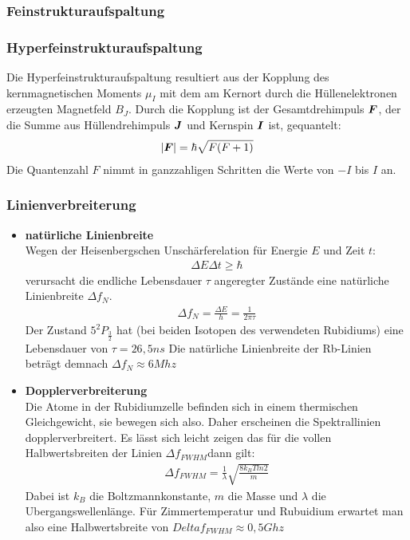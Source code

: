\documentclass[12pt]{article}
\renewcommand*\vec[1]{{\mbox{\boldmath\ensuremath{#1}}}}
\begin{document}
\subsubsection{Feinstrukturaufspaltung}

\subsubsection{Hyperfeinstrukturaufspaltung}
Die Hyperfeinstrukturaufspaltung resultiert aus der Kopplung des kernmagnetischen Moments $\mu_I$ mit dem am Kernort durch die Hüllenelektronen erzeugten Magnetfeld $B_J$.
Durch die Kopplung ist der Gesamtdrehimpuls $\vec{F}$, der die Summe aus Hüllendrehimpuls $\vec{J}$ und Kernspin $\vec{I}$ ist, gequantelt:
\begin{align*}
 \left|\vec{F}\right| = \hbar \sqrt{F(F+1)}
\end{align*}
Die Quantenzahl $F$ nimmt in ganzzahligen Schritten die Werte von $-I$ bis $I$ an.
\subsubsection{Linienverbreiterung}
\begin{itemize}
 \item \textbf{natürliche Linienbreite} \\
    Wegen der Heisenbergschen Unschärferelation für Energie $E$ und Zeit $t$:
    \begin{align*}
    \Delta E \Delta t \geq \hbar
    \end{align*}
    verursacht die endliche Lebensdauer $\tau$ angeregter Zustände eine natürliche Linienbreite $\Delta f_N$.
    \begin{align}
    \label{natbreite}
    \Delta f_N  = \frac{\Delta E}{h} = \frac{1}{2 \pi \tau}
    \end{align}
    Der Zustand $5^2P_{\frac{3}{2}}$ hat (bei beiden Isotopen des verwendeten Rubidiums) eine Lebensdauer von $\tau =26,5 ns$
    Die natürliche Linienbreite der Rb-Linien beträgt demnach $\Delta f_N \approx 6 Mhz$
 \item \textbf{Dopplerverbreiterung} \\
    Die Atome in der Rubidiumzelle befinden sich in einem thermischen Gleichgewicht, sie bewegen sich also. Daher erscheinen die Spektrallinien dopplerverbreitert. Es lässt sich leicht zeigen das für die vollen Halbwertsbreiten der Linien $\Delta f_{FWHM}$dann gilt:
    \begin{align}
    \label{FWHM}
     \Delta f_{FWHM} = \frac{1}{\lambda} \sqrt{\frac{8 k_B T ln 2}{m}}
    \end{align}
    Dabei ist $k_B$ die Boltzmannkonstante, $m$ die Masse und $\lambda$ die Ubergangswellenlänge.
Für Zimmertemperatur und Rubuidium erwartet man also eine Halbwertsbreite von $Delta f_{FWHM} \approx 0,5 Ghz$
\end{itemize}
\end{document}
